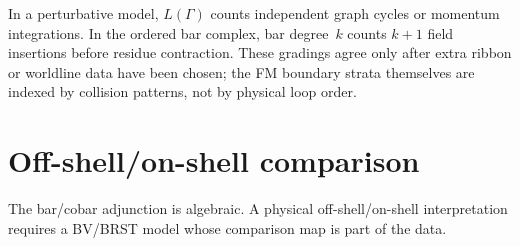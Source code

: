 \begin{remark}
In a perturbative model, $L(\Gamma)$ counts independent graph cycles or
momentum integrations.  In the ordered bar complex, bar degree~$k$
counts $k+1$ field insertions before residue contraction.  These
gradings agree only after extra ribbon or worldline data have been
chosen; the FM boundary strata themselves are indexed by collision
patterns, not by physical loop order.
\end{remark}

\section{Off-shell/on-shell comparison}

The bar/cobar adjunction is algebraic.  A physical off-shell/on-shell
interpretation requires a BV/BRST model whose comparison map is part of
the data.


